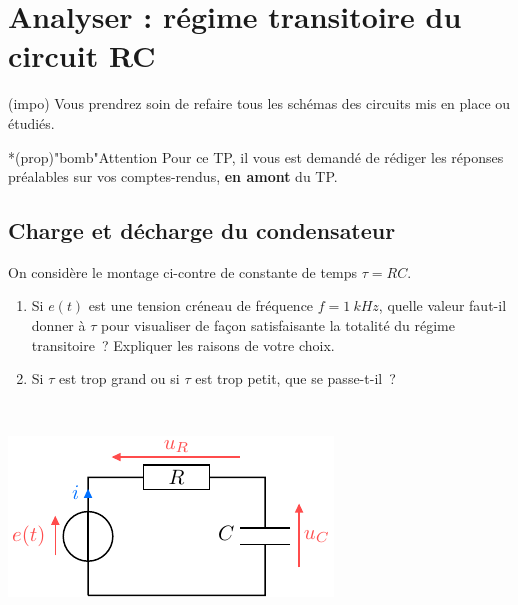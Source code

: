 \documentclass[../main/main.tex]{subfiles}
\begin{document}
\section{Analyser : régime transitoire du circuit RC}

\begin{tcb}(impo){}
	Vous prendrez soin de refaire tous les schémas des circuits mis en place ou
	étudiés.
\end{tcb}
\begin{tcb}*(prop)"bomb"{Attention}
	Pour ce TP, il vous est demandé de rédiger les réponses préalables sur vos
	comptes-rendus, \textbf{en amont} du TP.
\end{tcb}

\subsection{Charge et décharge du condensateur}
\label{ssec:chdech}

On considère le montage ci-contre de constante de temps $\tau = RC$.

\noindent
\begin{minipage}[t]{.65\linewidth}
	\begin{enumerate}[label=\clenumi]
		\item Si $e(t)$ est une tension créneau de fréquence $f = \SI{1}{kHz}$,
		      quelle valeur faut-il donner à $\tau$ pour visualiser de façon
		      satisfaisante la totalité du régime transitoire~? Expliquer les raisons
		      de votre choix.
		\item Si $\tau$ est trop grand ou si $\tau$ est trop petit, que se
		      passe-t-il~?
	\end{enumerate}
\end{minipage}
\hfill
\begin{minipage}[t]{.30\linewidth}
	~
	\begin{center}
		\includegraphics[width=\linewidth]{circ_rc-start}
	\end{center}
\end{minipage}
\end{document}
